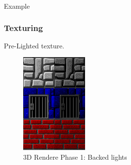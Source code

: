 Example























\subsubsection{Texturing}


Pre-Lighted texture.\\

  \begin{figure}[H]
\centering
 \includegraphics[width=\textwidth]{imgs/baked_lights.png}
 \caption{3D Rendere Phase 1: Backed lights} \label{fig:backee_lights}
 \end{figure}





